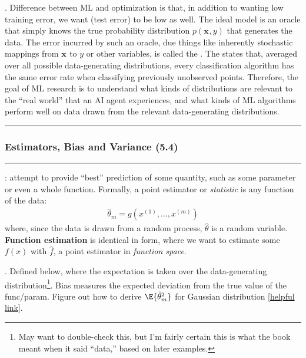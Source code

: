 \documentclass[11pt]{article}
\renewcommand\vec[2][]{\bm{#2}_{#1}}
\newcommand\myspace[1][]{\vspace{#1\bigskipamount}}
\newcommand\p{\Needspace{10\baselineskip} \noindent}
\newcommand\tlab[1]{\tag{#1}\label{#1}}
\newcommand\subsub[1]{\Needspace{15\baselineskip}\hrule\subsubsection{#1}\hrule}
\begin{document}
\p {}. Difference between ML and optimization is that, in addition to wanting low training error, we want  (test error) to be low as well. The ideal model is an oracle that simply knows the true probability distribution $p(\vec{x}, y)$ that generates the data. The error incurred by such an oracle, due things like inherently stochastic mappings from $\vec{x}$ to $y$ or other variables, is called the . The  states that, averaged over all possible data-generating distributions, every classification algorithm has the same error rate when classifying previously unobserved points. Therefore, the goal of ML research is to understand what kinds of distributions are relevant to the ``real world'' that an AI agent experiences, and what kinds of ML algorithms perform well on data drawn from the relevant data-generating distributions.

\myspace\myspace
\subsub{Estimators, Bias and Variance (5.4)}

\myspace
\p {}: attempt to provide ``best'' prediction of some quantity, such as some parameter or even a whole function. Formally, a point estimator or \textit{statistic} is any function of the data:
\begin{align}
\hat{\theta}_m = g\left(x^{(1)}, \ldots, x^{(m)}\right) \tlab{5.19}
\end{align}
where, since the data is drawn from a random process, $\hat{\theta}$ is a random variable. \textbf{Function estimation} is identical in form, where we want to estimate some $f(x)$ with $\hat f$, a point estimator in \textit{function space}. 

\myspace
\p {}. Defined below, where the expectation is taken over the data-generating distribution\footnote{May want to double-check this, but I'm fairly certain this is what the book meant when it said ``data,'' based on later examples.}. Bias measures the expected deviation from the true value of the func/param.
\graybox{
	\mathrm{bias}\left[\hat{\theta}_m\right] = \E{\hat{\theta}_m} - \theta \tlab{5.20}
}
 Figure out how to derive $\E{\hat{\theta}_m^2}$ for Gaussian distribution \href{http://math.stackexchange.com/questions/518281/how-to-derive-the-mean-and-variance-of-a-gaussian-random-variable}{[helpful link]}. 
\end{document}
